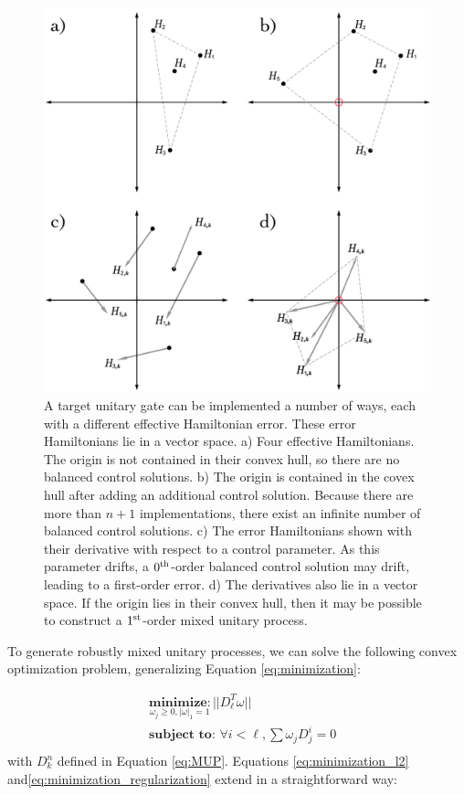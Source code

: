 \documentclass[aps,nofootinbib,pra,notitlepage,twocolumn]{revtex4-1}
\begin{document}
\begin{figure}
  \centering
  \includegraphics[width=\columnwidth]{vectorspace.pdf}
  \caption{A target unitary gate can be implemented a number of ways, each with a different effective Hamiltonian error. These error Hamiltonians lie in a vector space. a) Four effective Hamiltonians. The origin is not contained in their convex hull, so there are no balanced control solutions. b) The origin is contained in the covex hull after adding an additional control solution. Because there are more than $n+1$ implementations, there exist an infinite number of balanced control solutions. c) The error Hamiltonians shown with their derivative with respect to a control parameter. As this parameter drifts, a $0^{\rm th}$-order balanced control solution may drift, leading to a first-order error. d) The derivatives also lie in a vector space. If the origin lies in their convex hull, then it may be possible to construct a $1^{\rm{st}}$-order mixed unitary process.}
  \label{fig:vectorspace}
\end{figure}


To generate robustly mixed unitary processes, we can solve the following convex optimization problem, generalizing Equation \ref{eq:minimization}:

\begin{equation}\label{eq:robust_minimization}
  \begin{split}
    &\underset{\omega_j\geq0, |\omega|_1=1}{\textbf{minimize}: } ||D_{\ell}^T\omega||\\
    &\textbf{subject to: } \forall i<\ell, \sum \omega_jD_j^i=0\\
  \end{split}
\end{equation}
with $D_k^n$ defined in Equation \ref{eq:MUP}. Equations \ref{eq:minimization_l2} and\ref{eq:minimization_regularization} extend in a straightforward way:
\end{document}
